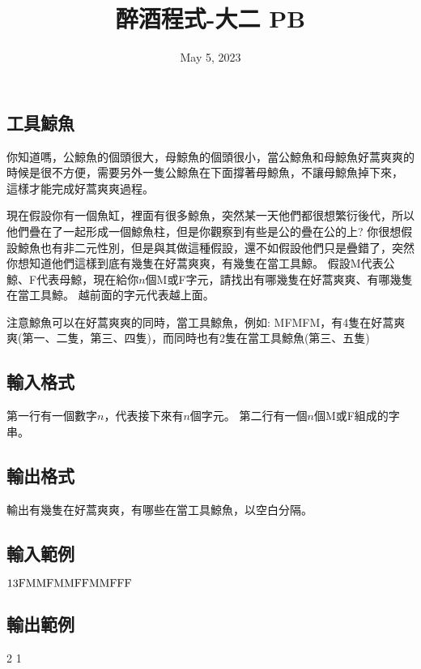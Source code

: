 \documentclass{article}
\title{醉酒程式-大二 PB}
\date{May 5, 2023}
\begin{document}
\begin{CJK*}{UTF8}{bsmi}

\maketitle

\section*{工具鯨魚}

你知道嗎，公鯨魚的個頭很大，母鯨魚的個頭很小，當公鯨魚和母鯨魚好蒿爽爽的時候是很不方便，需要另外一隻公鯨魚在下面撐著母鯨魚，不讓母鯨魚掉下來，
這樣才能完成好蒿爽爽過程。

現在假設你有一個魚缸，裡面有很多鯨魚，突然某一天他們都很想繁衍後代，所以他們疊在了一起形成一個鯨魚柱，但是你觀察到有些是公的疊在公的上?
你很想假設鯨魚也有非二元性別，但是與其做這種假設，還不如假設他們只是疊錯了，突然你想知道他們這樣到底有幾隻在好蒿爽爽，有幾隻在當工具鯨。
假設M代表公鯨、F代表母鯨，現在給你$n$個M或F字元，請找出有哪幾隻在好蒿爽爽、有哪幾隻在當工具鯨。
越前面的字元代表越上面。

注意鯨魚可以在好蒿爽爽的同時，當工具鯨魚，例如: MFMFM，有4隻在好蒿爽爽(第一、二隻，第三、四隻)，而同時也有2隻在當工具鯨魚(第三、五隻)

\subsection*{輸入格式}
第一行有一個數字$n$，代表接下來有$n$個字元。
第二行有一個$n$個M或F組成的字串。

\subsection*{輸出格式}
輸出有幾隻在好蒿爽爽，有哪些在當工具鯨魚，以空白分隔。

\subsection*{輸入範例}
$13\\\text{FMMFMMFFMMFFF}$

\subsection*{輸出範例}
2 1

\end{CJK*}
\end{document}
